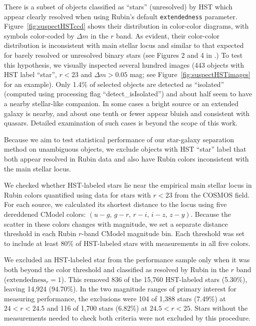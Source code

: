 There is a subset of objects classified as ``stars'' (unresolved) by HST which appear clearly
resolved when using Rubin's default \texttt{extendedness} parameter. Figure~\ref{fig:suspectHSTccd}
shows their distribution in color-color diagrams, with symbols color-coded by \(\Delta m \) in the
$r$ band. As evident, their color-color distribution is inconsistent with main stellar locus and similar
to that expected for barely resolved or unresolved binary stars (see Figures 2 and 4 in \citealt{2004ApJ...615L.141S}.)
To test this hypothesis, we visually inspected several hundred images (443 objects with HST label
``star'', $r<23$ and $\Delta m > 0.05$ mag; see Figure~\ref{fig:suspectHSTimages} for an example). 
Only 1.4\% of selected objects are detected as ``isolated'' (computed using processing flag
``detect\_isIsolated'') and about half seem to have a nearby stellar-like companion. In some cases a
bright source or an extended galaxy is nearby, and about one tenth or fewer appear bluish and
consistent with quasars. Detailed examination of such cases is beyond the scope of this work. 

Because we aim to test statistical performance of our star-galaxy separation method on unambiguous
objects, we exclude objects with HST ``star'' label that both appear resolved in Rubin data and also
have Rubin colors inconsistent with the main stellar locus. 

We checked whether HST-labeled stars lie near the empirical main stellar
locus in Rubin colors quantified using data for stars with $r<23$  from the COSMOS field.
For each source, we calculated its shortest distance to the locus using
five dereddened CModel colors: $(u-g,\,g-r,\,r-i,\,i-z,\,z-y)$. Because the
scatter in these colors changes with magnitude, we set a separate distance
threshold in each Rubin $r$-band CModel magnitude bin. Each threshold was set
to include at least 80\% of HST-labeled stars with measurements in all five
colors.

We excluded an HST-labeled star from the performance sample only when it was
both beyond the color threshold and classified as resolved by Rubin in the
$r$ band ($\mathrm{extendedness}_r=1$). This removed 836 of the 15,760
HST-labeled stars (5.30\%), leaving 14,924 (94.70\%). In the two magnitude
ranges of primary interest for measuring performance, the exclusions were 104 of 1,388 stars (7.49\%) at
$24<r<24.5$ and 116 of 1,700 stars (6.82\%) at $24.5<r<25$. Stars without the
measurements needed to check both criteria were not excluded by this
procedure.